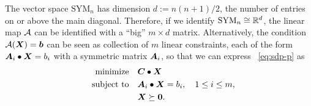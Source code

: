 The vector space $\mathrm{SYM}_n$ has dimension $d:=n(n+1)/2$, the number of entries on or above the main diagonal. Therefore, if we identify $\mathrm{SYM}_n\cong \mathbb{R}^{d}$, the linear map $\mathcal{\bm{A}}$ can be identified with a ``big'' $m\times d$ matrix. Alternatively, the condition $\mathcal{\bm{A}}(\bm{X})=\bm{b}$ can be seen as collection of $m$ linear constraints, each of the form $\bm{A}_i\bullet \bm{X}=b_i$ with a symmetric matrix $\bm{A}_i$, so that we can express ~\eqref{eq:sdp-p} as
\begin{align*}
 \text{minimize}\quad & \bm{C}\bullet \bm{X}\\
 \quad\text{subject to}\quad & \bm{A}_i\bullet \bm{X} = b_i, \quad 1\leq i\leq m,\\
 & \bm{X}\succeq \bm{0}.
\end{align*}

